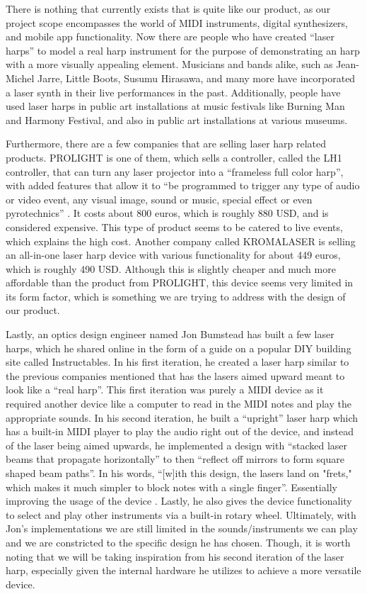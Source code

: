 There is nothing that currently exists that is quite like our product, as our project scope encompasses the world of MIDI instruments, digital synthesizers, and mobile app functionality. Now there are people who have created “laser harps” to model a real harp instrument for the purpose of demonstrating an harp with a more visually appealing element. Musicians and bands alike, such as Jean-Michel Jarre, Little Boots, Susumu Hirasawa, and many more have incorporated a laser synth in their live performances in the past. Additionally, people have used laser harps in public art installations at music festivals like Burning Man and Harmony Festival, and also in public art installations at various museums. 

Furthermore, there are a few companies that are selling laser harp related products. PROLIGHT is one of them, which sells a controller, called the LH1 controller, that can turn any laser projector into a “frameless full color harp”, with added features that allow it to “be programmed to trigger any type of audio or video event, any visual image, sound or music, special effect or even pyrotechnics” \cite{PROLIGHT 2019}. It costs about 800 euros, which is roughly 880 USD, and is considered expensive. This type of product seems to be catered to live events, which explains the high cost. Another company called KROMALASER is selling an all-in-one laser harp device with various functionality for about 449 euros, which is roughly 490 USD. Although this is slightly cheaper and much more affordable than the product from PROLIGHT, this device seems very limited in its form factor, which is something we are trying to address with the design of our product.

Lastly, an optics design engineer named Jon Bumstead has built a few laser harps, which he shared online in the form of a guide on a popular DIY building site called Instructables. In his first iteration, he created a laser harp similar to the previous companies mentioned that has the lasers aimed upward meant to look like a “real harp”. This first iteration was purely a MIDI device as it required another device like a computer to read in the MIDI notes and play the appropriate sounds. In his second iteration, he built a “upright” laser harp which has a built-in MIDI player to play the audio right out of the device, and instead of the laser being aimed upwards, he implemented a design with “stacked laser beams that propagate horizontally” to then “reflect off mirrors to form square shaped beam paths”. In his words, “[w]ith this design, the lasers land on "frets," which makes it much simpler to block notes with a single finger”. Essentially improving the usage of the device \cite{Bumstead2019}. Lastly, he also gives the device functionality to select and play other instruments via a built-in rotary wheel. Ultimately, with Jon’s implementations we are still limited in the sounds/instruments we can play and we are constricted to the specific design he has chosen. Though, it is worth noting that we will be taking inspiration from his second iteration of the laser harp, especially given the internal hardware he utilizes to achieve a more versatile device.

